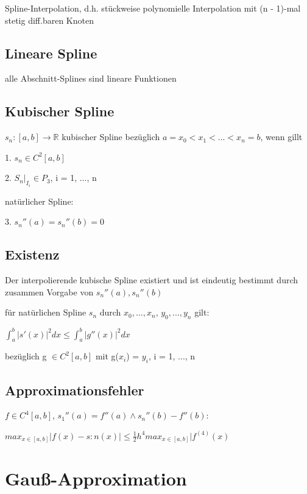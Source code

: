 \documentclass[12pt,a4paper]{article} %
\newcommand*\tab[1][1cm]{\hspace*{#1}}
\begin{document}
	Spline-Interpolation, d.h. stückweise polynomielle Interpolation mit (n - 1)-mal stetig diff.baren Knoten
	
	\subsection{Lineare Spline}
	
	alle Abschnitt-Splines sind lineare Funktionen
	
	\subsection{Kubischer Spline}
	
	$s_n: [a, b] \rightarrow \mathbb{R}$ kubischer Spline bezüglich $a = x_0 < x_1 < ... < x_n = b$, wenn gillt
	
	1. $s_n \in C^2[a, b]$
	
	2. $S_n|_{I_i} \in P_3$, i = 1, ..., n
	
	natürlicher Spline:
	
	3. $s_n''(a) = s_n''(b) = 0$
	
	\subsection{Existenz}
	
	Der interpolierende kubische Spline existiert und ist eindeutig bestimmt durch zusammen Vorgabe von $s_n''(a), s_n''(b)$
	
	für natürlichen Spline $s_n$ durch $x_0, ..., x_n$, $y_0, ..., y_n$ gilt:
	
	\tab $\int_{a}^{b}|s'(x)|^2dx \le \int_{a}^{b}|g''(x)|^2dx$
	
	bezüglich g $\in C^2[a, b]$ mit g($x_i$) = $y_i$, i = 1, ..., n
	
	\subsection{Approximationsfehler}
	
	$f \in C^4[a, b]$, $s_1''(a) = f''(a) \wedge s_n''(b) - f''(b)$:
	
	$max_{x \in [a, b]}|f(x) - s:n(x)| \le \frac{1}{2}h^4 max_{x \in [a, b]}|f^{(4)}(x)$
	
	\newpage
	
	\section{Gauß-Approximation}
	
\end{document}

